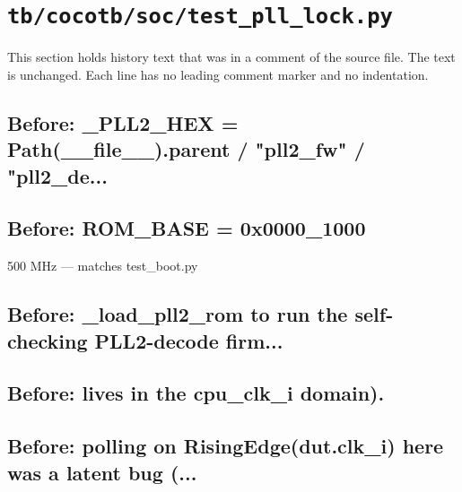 \section{\texttt{tb/cocotb/soc/test\_pll\_lock.py}}\label{cr:suite:soc-test-pll-lock}

This section holds history text that was in a comment of the source file. The text is unchanged. Each line has no leading comment marker and no indentation.

\begin{record}

\subsection*{Before: \_PLL2\_HEX = Path(\_\_file\_\_).parent / "pll2\_fw" / "pll2\_de...}


\subsection*{Before: ROM\_BASE         = 0x0000\_1000}

\begin{textblock}
500 MHz — matches test_boot.py
\end{textblock}

\subsection*{Before: \_load\_pll2\_rom to run the self-checking PLL2-decode firm...}


\subsection*{Before: lives in the cpu\_clk\_i domain).}


\subsection*{Before: polling on RisingEdge(dut.clk\_i) here was a latent bug (...}


\end{record}
